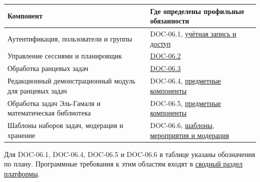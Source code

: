 \documentclass[12pt,a4paper]{article}
\begin{document}
{\def\LTcaptype{none} %
\begin{longtable}[]{@{}
  >{\raggedright\arraybackslash}p{}
  >{\raggedright\arraybackslash}p{}@{}}
\toprule\noalign{}
\begin{minipage}[b]{\linewidth}\raggedright
Компонент
\end{minipage} & \begin{minipage}[b]{\linewidth}\raggedright
Где определены профильные обязанности
\end{minipage} \\
\midrule\noalign{}
\endhead
\bottomrule\noalign{}
\endlastfoot
Аутентификация, пользователи и группы & DOC-06.1, {\href{../07\_Программные\_требования/DOC-06\_Программные\_требования.pdf\#учётная-запись-и-доступ}{учётная запись и доступ}} \\
Управление сессиями и планировщик & {\href{../07\_Программные\_требования/DOC-06.2\_Сессии\_задач\_и\_планировщик.pdf\#doc-062-сессии-задач-и-планировщик}{DOC-06.2}} \\
Обработка ранцевых задач & {\href{../07\_Программные\_требования/DOC-06.3\_Ранцевые\_криптосистемы.pdf\#doc-063-ранцевые-криптосистемы}{DOC-06.3}} \\
Редакционный демонстрационный модуль для ранцевых задач & DOC-06.4, {\href{../07\_Программные\_требования/DOC-06\_Программные\_требования.pdf\#предметные-компоненты}{предметные компоненты}} \\
Обработка задач Эль-Гамаля и математическая библиотека & DOC-06.5, {\href{../07\_Программные\_требования/DOC-06\_Программные\_требования.pdf\#предметные-компоненты}{предметные компоненты}} \\
Шаблоны наборов задач, модерация и хранение & DOC-06.6, {\href{../07\_Программные\_требования/DOC-06\_Программные\_требования.pdf\#шаблоны-набора-задач-контрольные-мероприятия-и-модерация}{шаблоны, мероприятия и модерация}} \\
\end{longtable}
}

Для DOC-06.1, DOC-06.4, DOC-06.5 и DOC-06.6 в таблице указаны обозначения по плану. Программные требования к этим областям входят в {\href{../07\_Программные\_требования/DOC-06\_Программные\_требования.pdf\#doc-06-программные-требования-платформы}{сводный раздел платформы}}.
\end{document}
